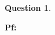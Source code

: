 \documentclass{article}
\newtheorem{question}{Question}
\begin{document}
\begin{myBox}[]{}
\begin{question}
\begin{comment}
        To construct the desired osculating sequence we shall use the automorphisms $\psi_\alpha=(\alpha-z)/(1-\overline{\alpha}z)$.
        \begin{itemize}
            \item[(d)] Given a Koebe domain $K$, choose a point $\alpha\in \mathbb{D}$ on the boundary of $K$ such that $|\alpha|=r_K$, and also choose $\beta\in\mathbb{D}$ such that $\beta^2=\alpha$.
            Let $S$ denote the square root of $\psi_\alpha$ on $K$ such that $S(0)=0$. Why is such a function well defined?
            Prove that the function $f:K\rightarrow\mathbb{D}$ defined by $f(z)=\psi_\beta\circ S\circ\psi_\alpha$ is an expansion.
            Moreover, show that $|f'(0)|=(1+r_K)/(2\sqrt{r_K})$.
            \item[(e)] Use part (d) to construct the desired sequence.
        \end{itemize}
        \end{comment}
    \end{question}
\end{myBox}

\textbf{Pf:}
\end{document}
